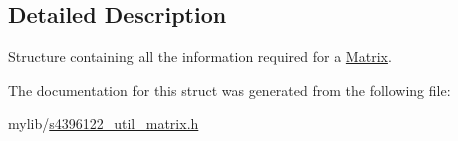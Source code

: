 \subsection{Detailed Description}
Structure containing all the information required for a \hyperlink{structMatrix}{Matrix}. 

The documentation for this struct was generated from the following file\+:\begin{DoxyCompactItemize}
\item 
mylib/\hyperlink{s4396122__util__matrix_8h}{s4396122\+\_\+util\+\_\+matrix.\+h}\end{DoxyCompactItemize}
